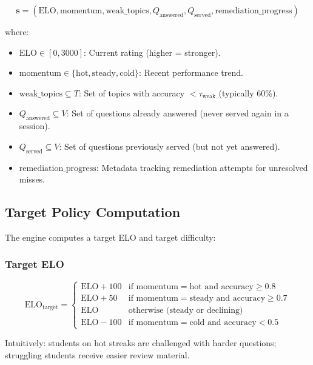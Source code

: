 \documentclass[sigconf,authordraft,twoside]{acmart}
\begin{document}
\begin{equation}
\mathbf{s} = (\text{ELO}, \text{momentum}, \text{weak\_topics}, Q_{\text{answered}}, Q_{\text{served}}, \text{remediation\_progress})
\end{equation}

where:

\begin{itemize}
\item $\text{ELO} \in [0, 3000]$: Current rating (higher = stronger).
\item $\text{momentum} \in \{\text{hot}, \text{steady}, \text{cold}\}$: Recent performance trend.
\item $\text{weak\_topics} \subseteq T$: Set of topics with accuracy $< \tau_{\text{weak}}$ (typically 60\%).
\item $Q_{\text{answered}} \subseteq V$: Set of questions already answered (never served again in a session).
\item $Q_{\text{served}} \subseteq V$: Set of questions previously served (but not yet answered).
\item $\text{remediation\_progress}$: Metadata tracking remediation attempts for unresolved misses.
\end{itemize}

\subsection{Target Policy Computation}

The engine computes a target ELO and target difficulty:

\subsubsection{Target ELO}
\begin{equation}
\text{ELO}_{\text{target}} = \begin{cases}
\text{ELO} + 100 & \text{if } \text{momentum} = \text{hot} \text{ and accuracy} \geq 0.8 \\
\text{ELO} + 50 & \text{if } \text{momentum} = \text{steady} \text{ and accuracy} \geq 0.7 \\
\text{ELO} & \text{otherwise (steady or declining)} \\
\text{ELO} - 100 & \text{if } \text{momentum} = \text{cold} \text{ and accuracy} < 0.5
\end{cases}
\end{equation}

Intuitively: students on hot streaks are challenged with harder questions; struggling students receive easier review material.
\end{document}

